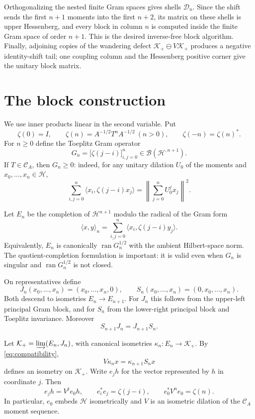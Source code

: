 \documentclass[11pt]{article}
\newcommand{\Hh}{\mathcal H}
\newcommand{\Kp}{\mathcal K_+}
\newcommand{\B}{\mathcal B}
\newcommand{\ran}{\operatorname{ran}}
\begin{document}
Orthogonalizing the nested finite Gram spaces gives shells
$\mathcal D_n$.  Since the shift sends the first $n+1$ moments into the first
$n+2$, its matrix on these shells is upper Hessenberg, and every block in
column $n$ is computed inside the finite Gram space of order $n+1$.  This is
the desired inverse-free block algorithm.  Finally, adjoining copies of the
wandering defect $\Kp\ominus V\Kp$ produces a negative identity-shift tail;
one coupling column and the Hessenberg positive corner give the unitary block
matrix.

\section{The block construction}

We use inner products linear in the second variable.  Put
\[
 \zeta(0)=I,\qquad
 \zeta(n)=A^{-1/2}T^nA^{-1/2}\ (n>0),\qquad
 \zeta(-n)=\zeta(n)^*.
\]
For $n\geq0$ define the Toeplitz Gram operator
\[
 G_n=\bigl[\zeta(j-i)\bigr]_{i,j=0}^n\in\B(\Hh^{,n+1}).
\]
If $T\in\mathcal C_A$, then $G_n\geq0$: indeed, for any unitary
dilation $U_0$ of the moments and $x_0,\ldots,x_n\in\Hh$,
\[
 \sum_{i,j=0}^n\langle x_i,\zeta(j-i)x_j\rangle
   =\left\|\sum_{j=0}^nU_0^jx_j\right\|^2.
\]

Let $E_n$ be the completion of $\Hh^{n+1}$ modulo the radical of the
Gram form
\begin{equation}\label{eq:gramform}
 \langle x,y\rangle_n
 =\sum_{i,j=0}^n\langle x_i,\zeta(j-i)y_j\rangle.
\end{equation}
Equivalently, $E_n$ is canonically $\overline{\ran G_n^{1/2}}$ with
the ambient Hilbert-space norm.  The quotient-completion formulation is important: it is
valid even when $G_n$ is singular and $\ran G_n^{1/2}$ is not closed.

On representatives define
\[
 J_n(x_0,\ldots,x_n)=(x_0,\ldots,x_n,0),\qquad
 S_n(x_0,\ldots,x_n)=(0,x_0,\ldots,x_n).
\]
Both descend to isometries $E_n\to E_{n+1}$.  For $J_n$ this follows
from the upper-left principal Gram block, and for $S_n$ from the
lower-right principal block and Toeplitz invariance.  Moreover
\begin{equation}\label{eq:compatibility}
 S_{n+1}J_n=J_{n+1}S_n.
\end{equation}

Let $\Kp=\varinjlim(E_n,J_n)$, with canonical isometries
$\kappa_n:E_n\to\Kp$.  By \eqref{eq:compatibility},
\begin{equation}\label{eq:Vdef}
 V\kappa_nx=\kappa_{n+1}S_nx
\end{equation}
defines an isometry on $\Kp$.  Write $e_jh$ for the vector represented
by $h$ in coordinate $j$.  Then
\begin{equation}\label{eq:moments}
 e_jh=V^je_0h,\qquad e_i^*e_j=\zeta(j-i),\qquad
 e_0^*V^ne_0=\zeta(n).
\end{equation}
In particular, $e_0$ embeds $\Hh$ isometrically and $V$ is an
isometric dilation of the $\mathcal C_A$ moment sequence.
\end{document}
